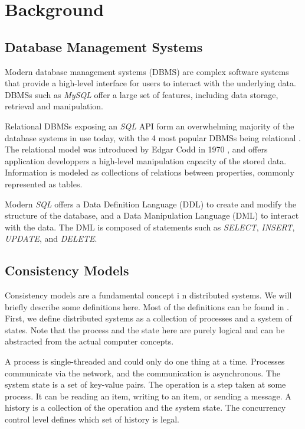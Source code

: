 \chapter{Background}

 
\section{Database Management Systems}

Modern database management systems (DBMS) are complex software systems that provide a high-level interface for users to interact with the underlying data. DBMSs such as \textit{MySQL} \cite{mysqlwebpage} offer a large set of features, including data storage, retrieval and manipulation.

Relational DBMSs exposing an \textit{SQL} API form an overwhelming majority of the database systems in use today, with the 4 most popular DBMSs being relational \cite{akhtar2023popularity}. The relational model was introduced by Edgar Codd in 1970 \cite{codd1970relational}, and offers application developpers a high-level manipulation capacity of the stored data. Information is modeled as collections of relations between properties, commonly represented as tables. 

Modern \textit{SQL} offers a Data Definition Language (DDL) to create and modify the structure of the database, and a Data Manipulation Language (DML) to interact with the data. The DML is composed of statements such as \textit{SELECT}, \textit{INSERT}, \textit{UPDATE}, and \textit{DELETE}.


\section{Consistency Models}


Consistency models are a fundamental concept i n distributed systems. We will briefly describe some definitions here. Most of the definitions can be found in \cite{Consiste95:online}. First, we define distributed systems as a collection of processes and a system of states. Note that the process and the state here are purely logical and can be abstracted from the actual computer concepts.

A process is single-threaded and could only do one thing at a time. Processes communicate via the network, and the communication is asynchronous. The system state is a set of key-value pairs. The operation is a step taken at some process. It can be reading an item, writing to an item, or sending a message. A history is a collection of the operation and the system state. The concurrency control level defines which set of history is legal.
